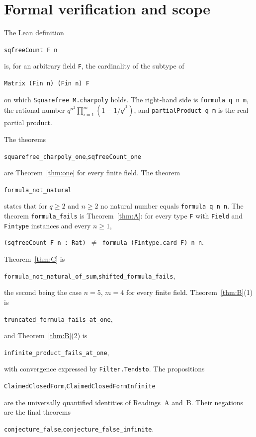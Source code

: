 \documentclass[11pt]{article}
\theoremstyle{remark}
\begin{document}
\section*{Formal verification and scope}
The Lean definition
\begin{center}\small\texttt{sqfreeCount F n}\end{center}
is, for an arbitrary field \texttt{F}, the cardinality of the subtype of
\begin{center}\small\texttt{Matrix (Fin n) (Fin n) F}\end{center}
on which \texttt{Squarefree M.charpoly} holds. The right-hand side is
\texttt{formula q n m}, the rational number
$q^{n^2}\prod_{i=1}^{m}(1-1/q^{i^2})$, and
\texttt{partialProduct q m} is the real partial product.

The theorems
\begin{center}\small
\texttt{squarefree\_charpoly\_one},\qquad \texttt{sqfreeCount\_one}
\end{center}
are Theorem~\ref{thm:one} for every finite field. The theorem
\begin{center}\small\texttt{formula\_not\_natural}\end{center}
states that for $q\ge2$ and $n\ge2$ no natural number equals
\texttt{formula q n n}. The theorem \texttt{formula\_fails} is
Theorem~\ref{thm:A}: for every type \texttt{F} with \texttt{Field} and
\texttt{Fintype} instances and every $n\ge1$,
\begin{center}\small
\texttt{(sqfreeCount F n : Rat) $\neq$ formula (Fintype.card F) n n}.
\end{center}
Theorem~\ref{thm:C} is
\begin{center}\small
\texttt{formula\_not\_natural\_of\_sum},\qquad \texttt{shifted\_formula\_fails},
\end{center}
the second being the case $n=5$, $m=4$ for every finite field.
Theorem~\ref{thm:B}(1) is
\begin{center}\small\texttt{truncated\_formula\_fails\_at\_one},\end{center}
and Theorem~\ref{thm:B}(2) is
\begin{center}\small\texttt{infinite\_product\_fails\_at\_one},\end{center}
with convergence expressed by \texttt{Filter.Tendsto}. The propositions
\begin{center}\small
\texttt{ClaimedClosedForm},\qquad \texttt{ClaimedClosedFormInfinite}
\end{center}
are the universally quantified identities of Readings~A and~B. Their
negations are the final theorems
\begin{center}\small
\texttt{conjecture\_false},\qquad \texttt{conjecture\_false\_infinite}.
\end{center}
\end{document}
